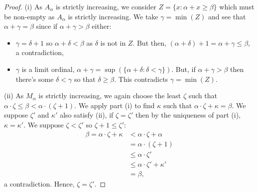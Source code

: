 \begin{proof}
    (i) As $A_\alpha$ is strictly increasing, we consider 
    $Z = \{x : \alpha + x \geq \beta\}$ which must be non-empty as
    $A_\alpha$ is strictly increasing.
    We take $\gamma = \min(Z)$ and see that $\alpha + \gamma = \beta$
    since if $\alpha + \gamma > \beta$ either: \begin{itemize}
        \item $\gamma = \delta + 1$ so $\alpha + \delta < \beta$ as
            $\delta$ is not in $Z$. But then,
            $(\alpha + \delta) + 1 = \alpha + \gamma \leq \beta$,
            a contradiction,
        \item $\gamma$ is a limit ordinal, $\alpha + \gamma =
            \sup(\{\alpha + \delta : \delta < \gamma\})$. But,
            if $\alpha + \gamma > \beta$ then there's some $\delta < \gamma$
            so that $\delta \geq \beta$. This contradicts $\gamma = \min(Z)$.
    \end{itemize} 
    (ii) As $M_\alpha$ is strictly increasing, we again choose the least
    $\zeta$ such that \linebreak
     $\alpha \cdot \zeta \leq \beta < \alpha \cdot (\zeta + 1)$. We apply
     part (i) to find $\kappa$ such that $\alpha \cdot \zeta + \kappa = \beta$.
     We suppose $\zeta'$ and $\kappa'$ also satisfy (ii), if $\zeta = \zeta'$
     then by the uniqueness of part (i), $\kappa = \kappa'$. We suppose
     $\zeta < \zeta'$ so $\zeta + 1 \leq \zeta'$: \begin{align*}
         \beta = \alpha \cdot \zeta + \kappa &< \alpha \cdot \zeta + \alpha \\
         &= \alpha \cdot (\zeta + 1) \\
         &\leq \alpha \cdot \zeta' \\
         &\leq \alpha \cdot \zeta' + \kappa' \\
         &= \beta,
     \end{align*} a contradiction. Hence, $\zeta = \zeta'$.
\end{proof}
